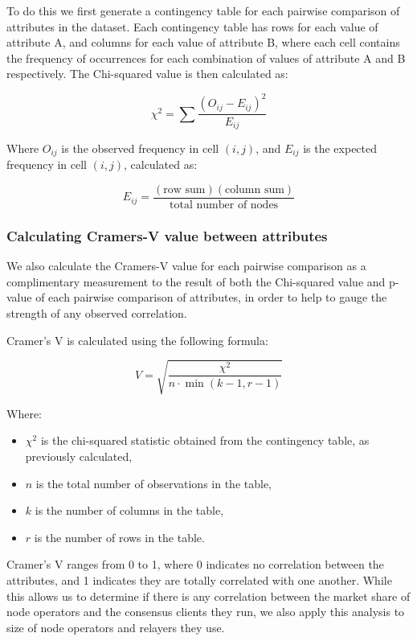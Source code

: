 \documentclass[conference]{IEEEtran}
\begin{document}
To do this we first generate a contingency table for each pairwise comparison of attributes in the dataset.  Each contingency table has rows for each value of attribute A, and columns for each value of attribute B, where each cell contains the frequency of occurrences for each combination of values of attribute A and B respectively. The Chi-squared value is then calculated as:

\[
\chi^2 = \sum \frac{(O_{ij} - E_{ij})^2}{E_{ij}}
\]

Where $O_{ij}$ is the observed frequency in cell $(i, j)$, and $E_{ij}$ is the expected frequency in cell $(i, j)$, calculated as:

\[
E_{ij} = \frac{(\text{row sum})(\text{column sum})}{\text{total number of nodes}}
\]

\subsubsection{Calculating Cramers-V value between attributes}
\label{sec:calculating-cramers-v-value-between-attributes}

We also calculate the Cramers-V value \cite{akoglu2018user} for each pairwise comparison as a complimentary measurement to the result of both the Chi-squared value and p-value of each pairwise comparison of attributes, in order to help to gauge the strength of any observed correlation.

Cramer's V is calculated using the following formula:

\[ V = \sqrt{\frac{\chi^2}{n \cdot \min(k-1, r-1)}} \]

Where:
\begin{itemize}
    \item $\chi^2$ is the chi-squared statistic obtained from the contingency table, as previously calculated,
    \item $n$ is the total number of observations in the table,
    \item $k$ is the number of columns in the table,
    \item $r$ is the number of rows in the table.
\end{itemize}

\vspace{8pt}

Cramer's V ranges from 0 to 1, where 0 indicates no correlation between the attributes, and 1 indicates they are totally correlated with one another.  While this allows us to determine if there is any correlation between the market share of node operators and the consensus clients they run, we also apply this analysis to size of node operators and relayers they use.
\end{document}
